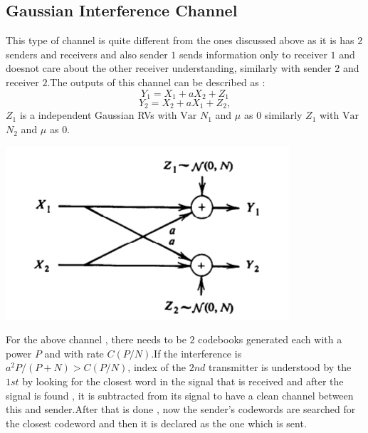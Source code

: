 \subsection{Gaussian Interference Channel}
This type of channel is quite different from the ones discussed above as it is has $2$ senders and receivers and also sender $1$ sends information only to receiver $1$ and doesnot care about the other receiver understanding, similarly with sender $2$ and receiver $2$.The outputs of this channel can be described as :
\begin{equation}
    Y_1 = X_1 + aX_2 + Z_1
\end{equation}
\begin{equation}
    Y_2 = X_2 + aX_1 + Z_2,
\end{equation}
\( Z_1 \) is a independent Gaussian RVs with $\mathrm{Var}$ \( N_1 \) and
$\mu$ as $0$ similarly  \( Z_1 \) with $\mathrm{Var}$ \( N_2 \)  and $\mu$ as $0$.
\begin{center}
	\includegraphics[scale=0.5]{Diagrams/Gaussian_Interference_Channel.png}
\end{center} 
For the above channel , there needs to be $2$ codebooks generated each with a power $P$ and with rate \( C(P/N) \).If the interference is \( a^2 P/(P + N) > C(P/N) \), index of the $2nd$ transmitter is understood by the $1st$ by looking for the closest word in the signal that is received and after the signal is found , it is subtracted from its signal to have a clean channel between this and sender.After that is done , now the sender's codewords are searched for the closest codeword and then it is declared as the one which is sent.

